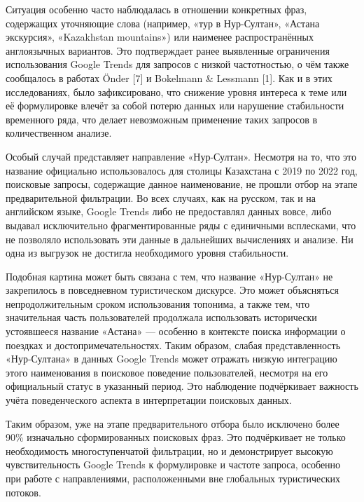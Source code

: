 \begin{multicols}{2}
Ситуация особенно часто наблюдалась в отношении конкретных фраз,
содержащих уточняющие слова (например, «тур в Нур-Султан», «Астана
экскурсия», «Kazakhstan mountains») или наименее распространённых
англоязычных вариантов. Это подтверждает ранее выявленные ограничения
использования Google Trends для запросов с низкой частотностью, о чём
также сообщалось в работах Önder {[}7{]} и Bokelmann \& Lessmann
{[}1{]}. Как и в этих исследованиях, было зафиксировано, что снижение
уровня интереса к теме или её формулировке влечёт за собой потерю данных
или нарушение стабильности временного ряда, что делает невозможным
применение таких запросов в количественном анализе.

Особый случай представляет направление «Нур-Султан». Несмотря на то, что
это название официально использовалось для столицы Казахстана с 2019 по
2022 год, поисковые запросы, содержащие данное наименование, не прошли
отбор на этапе предварительной фильтрации. Во всех случаях, как на
русском, так и на английском языке, Google Trends либо не предоставлял
данных вовсе, либо выдавал исключительно фрагментированные ряды с
единичными всплесками, что не позволяло использовать эти данные в
дальнейших вычислениях и анализе. Ни одна из выгрузок не достигла
необходимого уровня стабильности.

Подобная картина может быть связана с тем, что название «Нур-Султан» не
закрепилось в повседневном туристическом дискурсе. Это может объясняться
непродолжительным сроком использования топонима, а также тем, что
значительная часть пользователей продолжала использовать исторически
устоявшееся название «Астана» --- особенно в контексте поиска информации
о поездках и достопримечательностях. Таким образом, слабая
представленность «Нур-Султана» в данных Google Trends может отражать
низкую интеграцию этого наименования в поисковое поведение
пользователей, несмотря на его официальный статус в указанный период.
Это наблюдение подчёркивает важность учёта поведенческого аспекта в
интерпретации поисковых данных.

Таким образом, уже на этапе предварительного отбора было исключено более
90\% изначально сформированных поисковых фраз. Это подчёркивает не
только необходимость многоступенчатой фильтрации, но и демонстрирует
высокую чувствительность Google Trends к формулировке и частоте запроса,
особенно при работе с направлениями, расположенными вне глобальных
туристических потоков.
\end{multicols}

